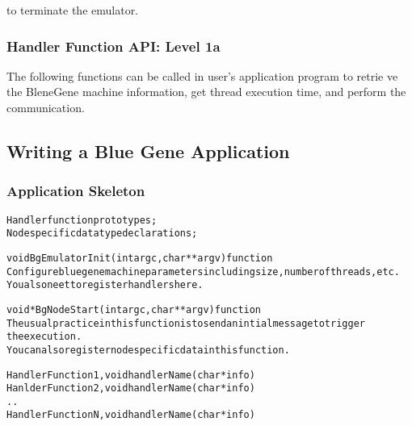 
to terminate the emulator.

\subsubsection{Handler Function API: Level 1a}

The following functions can be called in user's application program to retrie
ve the BleneGene machine information, get thread execution time, and perform
the communication.








\subsection{Writing a Blue Gene Application}

\subsubsection{Application Skeleton}

\begin{alltt}
Handler function prototypes;
Node specific data type declarations;

void  BgEmulatorInit(int argc, char **argv)  function
  Configure bluegene machine parameters including size, number of threads, etc.
  You also neet to register handlers here.

void *BgNodeStart(int argc, char **argv) function
  The usual practice in this function is to send an intial message to trigger 
  the execution.
  You can also register node specific data in this function.

Handler Function 1, void handlerName(char *info)
Hanlder Function 2, void handlerName(char *info)
..
Handler Function N, void handlerName(char *info)

\end{alltt}

